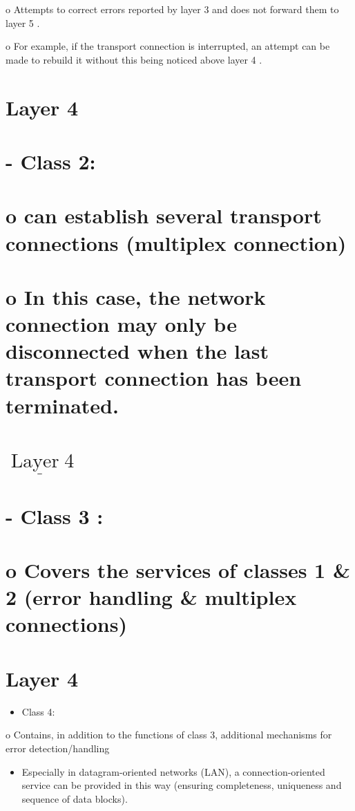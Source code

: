 \documentclass[10pt]{article}
\begin{document}
o Attempts to correct errors reported by layer 3 and does not forward them to layer 5 .

o For example, if the transport connection is interrupted, an attempt can be made to rebuild it without this being noticed above layer 4 .

\section{Layer 4}
\section{- Class 2:}
\section{o can establish several transport connections (multiplex connection)}
\section{o In this case, the network connection may only be disconnected when the last transport connection has been terminated.}
\section{$\underline{\operatorname{Layer} 4}$}
\section{- Class 3 :}
\section{o Covers the services of classes 1 \& 2 (error handling \& multiplex connections)}
\section{Layer 4}
\begin{itemize}
  \item Class 4:
\end{itemize}

o Contains, in addition to the functions of class 3, additional mechanisms for error detection/handling

\begin{itemize}
  \item Especially in datagram-oriented networks (LAN), a connection-oriented service can be provided in this way (ensuring completeness, uniqueness and sequence of data blocks).
\end{itemize}
\end{document}
